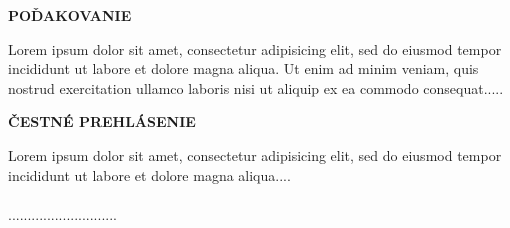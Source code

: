 \newpage
\thispagestyle{plain}
\vspace*{15cm} 
\begin{large}
\noindent
\textbf{POĎAKOVANIE} \\
\end{large}
\noindent
Lorem ipsum dolor sit amet, consectetur adipisicing elit, sed do eiusmod tempor incididunt ut labore et dolore magna aliqua. Ut enim ad minim veniam, quis nostrud exercitation ullamco laboris nisi ut aliquip ex ea commodo consequat.....
\newpage
\thispagestyle{plain}
\vspace*{15cm} 
\begin{large}
\noindent
\textbf{ČESTNÉ PREHLÁSENIE} \\
\end{large}
\noindent
Lorem ipsum dolor sit amet, consectetur adipisicing elit, sed do eiusmod tempor incididunt ut labore et dolore magna aliqua....\\
\vspace*{0.5cm}\\
\hspace*{10cm}............................\\
\hspace*{10.7cm} \Author
